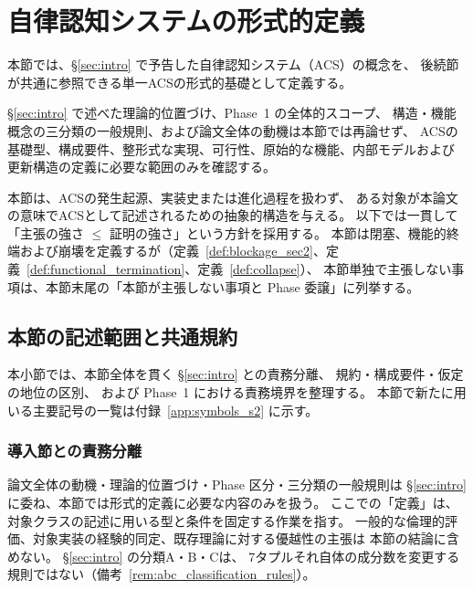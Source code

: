 \section{自律認知システムの形式的定義}
\label{sec:acs_def}

本節では、\S\ref{sec:intro} で予告した自律認知システム（ACS）の概念を、
後続節が共通に参照できる単一ACSの形式的基礎として定義する。

\S\ref{sec:intro} で述べた理論的位置づけ、Phase~1 の全体的スコープ、
構造・機能概念の三分類の一般規則、および論文全体の動機は本節では再論せず、
ACSの基礎型、構成要件、整形式な実現、可行性、原始的な機能、内部モデルおよび
更新構造の定義に必要な範囲のみを確認する。

本節は、ACSの発生起源、実装史または進化過程を扱わず、
ある対象が本論文の意味でACSとして記述されるための抽象的構造を与える。
以下では一貫して「主張の強さ $\leq$ 証明の強さ」という方針を採用する。
本節は閉塞、機能的終端および崩壊を定義するが（定義~\ref{def:blockage_sec2}、定義~\ref{def:functional_termination}、定義~\ref{def:collapse}）、
本節単独で主張しない事項は、本節末尾の「本節が主張しない事項と Phase 委譲」に列挙する。

\subsection{本節の記述範囲と共通規約}
\label{subsec:s2_scope}
\label{subsec:sec2_intro}

本小節では、本節全体を貫く \S\ref{sec:intro} との責務分離、
規約・構成要件・仮定の地位の区別、
および Phase~1 における責務境界を整理する。
本節で新たに用いる主要記号の一覧は付録~\ref{app:symbols_s2} に示す。

\subsubsection{導入節との責務分離}
\label{subsubsec:s2_s1_boundary}

論文全体の動機・理論的位置づけ・Phase 区分・三分類の一般規則は
\S\ref{sec:intro} に委ね、本節では形式的定義に必要な内容のみを扱う。
ここでの「定義」は、対象クラスの記述に用いる型と条件を固定する作業を指す。
一般的な倫理的評価、対象実装の経験的同定、既存理論に対する優越性の主張は
本節の結論に含めない。
\S\ref{sec:intro} の分類A・B・Cは、
7タプルそれ自体の成分数を変更する規則ではない（備考~\ref{rem:abc_classification_rules}）。

